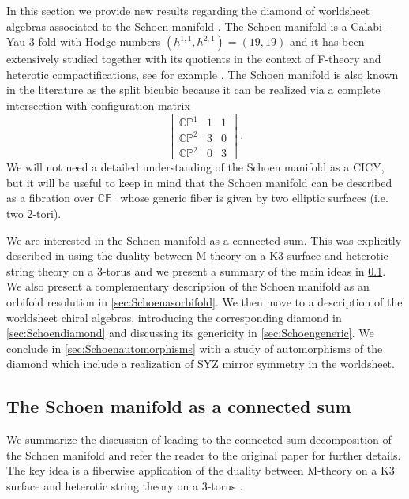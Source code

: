 \documentclass{pspum-l}
\theoremstyle{definition}
\theoremstyle{remark}
\numberwithin{equation}{section}
\begin{document}
In this section we provide new results regarding the diamond of worldsheet algebras associated to the Schoen manifold \cite{Schoen1988}. The Schoen manifold is a Calabi--Yau 3-fold with Hodge numbers $\left( h^{1,1}, h^{2,1} \right)=(19,19)$ and it has been extensively studied together with its quotients in the context of F-theory and heterotic compactifications, see for example \cite{Morrison:1996pp, Gopakumar:1996mu, Curio:1997rn, Braun:2005ux, Braun:2005nv, Candelas:2007ac, Apruzzi:2014dza}. The Schoen manifold is also known in the literature as the split bicubic because it can be realized via a complete intersection with configuration matrix
\begin{equation}
    \left[
    \begin{array}{c|cc}
        \mathbb{CP}^1 & 1 & 1 \\
        \mathbb{CP}^2 & 3 & 0 \\
        \mathbb{CP}^2 & 0 & 3       
    \end{array}
    \right] \, .
\end{equation}
We will not need a detailed understanding of the Schoen manifold as a CICY, but it will be useful to keep in mind that the Schoen manifold can be described as a fibration over $\mathbb{CP}^1$ whose generic fiber is given by two elliptic surfaces (i.e. two 2-tori).

We are interested in the Schoen manifold as a connected sum. This was explicitly described in \cite{Braun:2017uku} using the duality between M-theory on a K3 surface and heterotic string theory on a 3-torus and we present a summary of the main ideas in \cref{sec:SchoenfromMtheory}. We also present a complementary description of the Schoen manifold as an orbifold resolution in \cref{sec:Schoenasorbifold}. We then move to a description of the worldsheet chiral algebras, introducing the corresponding diamond in \cref{sec:Schoendiamond} and discussing its genericity in \cref{sec:Schoengeneric}. We conclude in \cref{sec:Schoenautomorphisms} with a study of automorphisms of the diamond which include a realization of SYZ mirror symmetry in the worldsheet.



\subsection{The Schoen manifold as a connected sum}

\label{sec:SchoenfromMtheory}

We summarize the discussion of \cite{Braun:2017uku} leading to the connected sum decomposition of the Schoen manifold and refer the reader to the original paper for further details. The key idea is a fiberwise application of the duality between M-theory on a K3 surface and heterotic string theory on a 3-torus \cite{Acharya:1996ci, Acharya:2001gy, Gukov:2002jv}.
\end{document}
